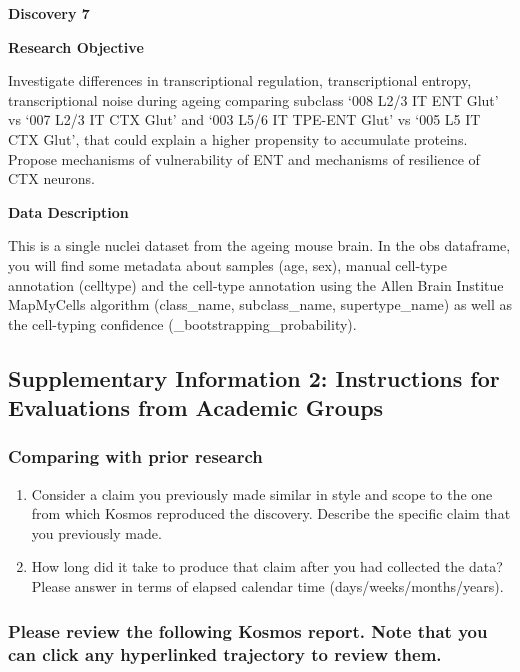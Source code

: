 \documentclass{article}
\begin{document}
\vspace{1em}

\noindent \textbf{Discovery 7} \par
\noindent \textbf{Research Objective} \par
Investigate differences in transcriptional regulation, transcriptional entropy, transcriptional noise during ageing comparing subclass ‘008 L2/3 IT ENT Glut’ vs ‘007 L2/3 IT CTX Glut’ and ‘003 L5/6 IT TPE-ENT Glut’ vs ‘005 L5 IT CTX Glut’, that could explain a higher propensity to accumulate proteins. Propose mechanisms of vulnerability of ENT and mechanisms of resilience of CTX neurons. \par
\noindent \textbf{Data Description} \par
This is a single nuclei dataset from the ageing mouse brain. In the obs dataframe, you will find some metadata about samples (age, sex), manual cell-type annotation (celltype) and the cell-type annotation using the Allen Brain Institue MapMyCells algorithm (class\_name, subclass\_name, supertype\_name) as well as the cell-typing confidence (\_bootstrapping\_probability). \par

\clearpage
{}
\subsection*{Supplementary Information 2: Instructions for Evaluations from Academic Groups}
\label{sec:supp_eval_instructions}

\subsubsection*{Comparing with prior research}
\begin{enumerate}
    \item Consider a claim you previously made similar in style and scope to the one from which Kosmos reproduced the discovery. Describe the specific claim that you previously made.
    
    \item How long did it take to produce that claim after you had collected the data? Please answer in terms of elapsed calendar time (days/weeks/months/years).
\end{enumerate}

\subsubsection*{Please review the following Kosmos report. Note that you can click any hyperlinked trajectory to review them.}
\end{document}
